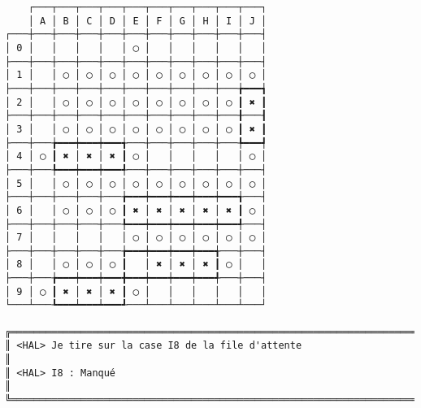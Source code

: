 {\scriptsize
\begin{verbatim}
    ┌───┬───┬───┬───┬───┬───┬───┬───┬───┬───┐
    │ A │ B │ C │ D │ E │ F │ G │ H │ I │ J │
┌───┼───┼───┼───┼───┼───┼───┼───┼───┼───┼───┤
│ 0 │   │   │   │   │ ◯ │   │   │   │   │   │
├───┼───┼───┼───┼───┼───┼───┼───┼───┼───┼───┤
│ 1 │   │ ◯ │ ◯ │ ◯ │ ◯ │ ◯ │ ◯ │ ◯ │ ◯ │ ◯ │
├───┼───┼───┼───┼───┼───┼───┼───┼───┼───╆━━━┪
│ 2 │   │ ◯ │ ◯ │ ◯ │ ◯ │ ◯ │ ◯ │ ◯ │ ◯ ┃ ✖ ┃
├───┼───┼───┼───┼───┼───┼───┼───┼───┼───╂───┨
│ 3 │   │ ◯ │ ◯ │ ◯ │ ◯ │ ◯ │ ◯ │ ◯ │ ◯ ┃ ✖ ┃
├───┼───╆━━━┿━━━┿━━━╅───┼───┼───┼───┼───╄━━━┩
│ 4 │ ◯ ┃ ✖ │ ✖ │ ✖ ┃ ◯ │   │   │   │   │ ◯ │
├───┼───╄━━━┿━━━┿━━━╃───┼───┼───┼───┼───┼───┤
│ 5 │   │ ◯ │ ◯ │ ◯ │ ◯ │ ◯ │ ◯ │ ◯ │ ◯ │ ◯ │
├───┼───┼───┼───┼───╆━━━┿━━━┿━━━┿━━━┿━━━╅───┤
│ 6 │   │ ◯ │ ◯ │ ◯ ┃ ✖ │ ✖ │ ✖ │ ✖ │ ✖ ┃ ◯ │
├───┼───┼───┼───┼───╄━━━┿━━━┿━━━┿━━━┿━━━╃───┤
│ 7 │   │   │   │   │ ◯ │ ◯ │ ◯ │ ◯ │ ◯ │ ◯ │
├───┼───┼───┼───┼───╆━━━┿━━━┿━━━┿━━━╅───┼───┤
│ 8 │   │ ◯ │ ◯ │ ◯ ┃   │ ✖ │ ✖ │ ✖ ┃ ◯ │   │
├───┼───╆━━━┿━━━┿━━━╋━━━┿━━━┿━━━┿━━━╃───┼───┤
│ 9 │ ◯ ┃ ✖ │ ✖ │ ✖ ┃ ◯ │   │   │   │   │   │
└───┴───┺━━━┷━━━┷━━━┹───┴───┴───┴───┴───┴───┘

╔══════════════════════════════════════════════════════════════════════════════════════════════════╗
║ <HAL> Je tire sur la case I8 de la file d'attente                                                ║
║ <HAL> I8 : Manqué                                                                                ║
╚══════════════════════════════════════════════════════════════════════════════════════════════════╝
\end{verbatim}}
\newpage

